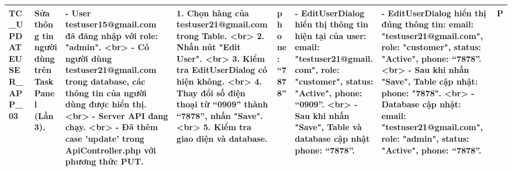 \documentclass[a4paper,12pt]{article}
\begin{document}
\begin{longtable}{|p{2cm}|p{3cm}|p{3cm}|p{4cm}|p{3cm}|p{3cm}|p{3cm}|p{2cm}|}
    TC_UPDATEUSER_APP_03 & Sửa thông tin người dùng trên TaskPanel (Lần 3). & - User testuser15@gmail.com đã đăng nhập với role: "admin". <br> - Có người dùng testuser21@gmail.com trong database, các thông tin của người dùng được hiển thị. <br> - Server API đang chạy. <br> - Đã thêm case 'update' trong ApiController.php với phương thức PUT. & 1. Chọn hàng của testuser21@gmail.com trong Table. <br> 2. Nhấn nút "Edit User". <br> 3. Kiểm tra EditUserDialog có hiện không. <br> 4. Thay đổi số điện thoại từ “0909” thành “7878”, nhấn "Save". <br> 5. Kiểm tra giao diện và database. & phone: “7878” & - EditUserDialog hiển thị thông tin hiện tại của user: email: "testuser21@gmail.com", role: "customer", status: "Active", phone: “0909”. <br> - Sau khi nhấn "Save", Table và database cập nhật phone: “7878”. & - EditUserDialog hiển thị đúng thông tin: email: "testuser21@gmail.com", role: "customer", status: "Active", phone: “7878”. <br> - Sau khi nhấn "Save", Table cập nhật: phone: "7878". <br> - Database cập nhật: email: "testuser21@gmail.com", role: "admin", status: "Active", phone: “7878”. & P \\ \hline
\end{longtable}
\end{document}
